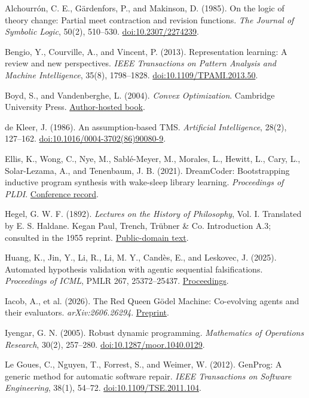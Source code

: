\documentclass[11pt,a4paper]{article}
\begin{document}
Alchourrón, C. E., Gärdenfors, P., and Makinson, D. (1985). On the logic of theory change: Partial meet contraction and revision functions. \emph{The Journal of Symbolic Logic}, 50(2), 510–530. \href{https://doi.org/10.2307/2274239}{doi:10.2307/2274239}.


Bengio, Y., Courville, A., and Vincent, P. (2013). Representation learning: A review and new perspectives. \emph{IEEE Transactions on Pattern Analysis and Machine Intelligence}, 35(8), 1798–1828. \href{https://doi.org/10.1109/TPAMI.2013.50}{doi:10.1109/TPAMI.2013.50}.


Boyd, S., and Vandenberghe, L. (2004). \emph{Convex Optimization}. Cambridge University Press. \href{https://web.stanford.edu/~boyd/cvxbook/bv_cvxbook.pdf}{Author-hosted book}.


de Kleer, J. (1986). An assumption-based TMS. \emph{Artificial Intelligence}, 28(2), 127–162. \href{https://doi.org/10.1016/0004-3702(86)90080-9}{doi:10.1016/0004-3702(86)90080-9}.


Ellis, K., Wong, C., Nye, M., Sablé-Meyer, M., Morales, L., Hewitt, L., Cary, L., Solar-Lezama, A., and Tenenbaum, J. B. (2021). DreamCoder: Bootstrapping inductive program synthesis with wake-sleep library learning. \emph{Proceedings of PLDI}. \href{https://www.pldi21.org/poster_pldi.355.html}{Conference record}.


Hegel, G. W. F. (1892). \emph{Lectures on the History of Philosophy}, Vol. I. Translated by E. S. Haldane. Kegan Paul, Trench, Trübner \& Co. Introduction A.3; consulted in the 1955 reprint. \href{https://www.gutenberg.org/files/51635/51635-h/51635-h.htm}{Public-domain text}.


Huang, K., Jin, Y., Li, R., Li, M. Y., Candès, E., and Leskovec, J. (2025). Automated hypothesis validation with agentic sequential falsifications. \emph{Proceedings of ICML}, PMLR 267, 25372–25437. \href{https://proceedings.mlr.press/v267/huang25n.html}{Proceedings}.


Iacob, A., et al. (2026). The Red Queen Gödel Machine: Co-evolving agents and their evaluators. \emph{arXiv:2606.26294}. \href{https://arxiv.org/abs/2606.26294}{Preprint}.


Iyengar, G. N. (2005). Robust dynamic programming. \emph{Mathematics of Operations Research}, 30(2), 257–280. \href{https://doi.org/10.1287/moor.1040.0129}{doi:10.1287/moor.1040.0129}.


Le Goues, C., Nguyen, T., Forrest, S., and Weimer, W. (2012). GenProg: A generic method for automatic software repair. \emph{IEEE Transactions on Software Engineering}, 38(1), 54–72. \href{https://doi.org/10.1109/TSE.2011.104}{doi:10.1109/TSE.2011.104}.
\end{document}
